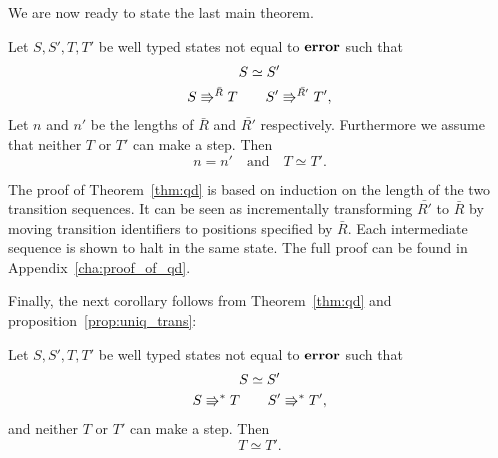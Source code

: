We are now ready to state the last main theorem.

\begin{theorem} \label{thm:qd}
  Let $S, S', T, T'$ be well typed states not equal to $\mbox{{\bf error}}$ such that
  \begin{equation*}
    \begin{gathered}
      S \simeq S' \\
      S \Rrightarrow^{\bar{R}} T \quad\quad S' \Rrightarrow^{\bar{R'}} T',
    \end{gathered}
  \end{equation*}
  Let $n$ and $n'$ be the lengths of $\bar{R}$ and $\bar{R'}$ respectively.
  Furthermore we assume that neither $T$ or $T'$ can make a step. Then
  \begin{equation*}
    n = n' \quad \text{and} \quad T \simeq T'.
  \end{equation*}
\end{theorem}

The proof of Theorem~\ref{thm:qd} is based on induction on the length of the two
transition sequences. It can be seen as incrementally transforming $\bar{R'}$ to
$\bar{R}$ by moving transition identifiers to positions specified by $\bar{R}$.
Each intermediate sequence is shown to halt in the same state. The full proof
can be found in Appendix~\ref{cha:proof_of_qd}.

Finally, the next corollary follows from Theorem~\ref{thm:qd} and
proposition~\ref{prop:uniq_trans}:
\begin{corollary}
  Let $S, S', T, T'$ be well typed states not equal to $\mbox{{\bf error}}$ such that
  \begin{equation*}
    \begin{gathered}
      S \simeq S' \\
      S \Rrightarrow^* T \quad\quad S' \Rrightarrow^* T',
    \end{gathered}
  \end{equation*}
  and neither $T$ or $T'$ can make a step.  Then
  \begin{equation*}
    T \simeq T'.
  \end{equation*}
\end{corollary}

